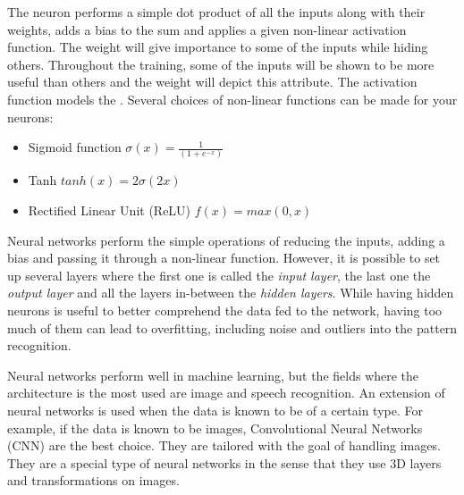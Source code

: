 
The neuron performs a simple dot product of all the inputs along with their weights, adds a bias to the sum and applies a given non-linear activation function. The weight will give importance to some of the inputs while hiding others. Throughout the training, some of the inputs will be shown to be more useful than others and the weight will depict this attribute. The activation function models the . Several choices of non-linear functions can be made for your neurons:
\begin{itemize}
  \item Sigmoid function $\sigma(x) = \frac{1}{(1+e^{-x})}$
  \item Tanh $tanh(x) = 2\sigma(2x)$
  \item Rectified Linear Unit (ReLU) $ f(x) = max(0,x) $
\end{itemize}

Neural networks perform the simple operations of reducing the inputs, adding a bias and passing it through a non-linear function. However, it is possible to set up several layers where the first one is called the \emph{input layer}, the last one the \emph{output layer} and all the layers in-between the \emph{hidden layers}. While having hidden neurons is useful to better comprehend the data fed to the network, having too much of them can lead to overfitting, including noise and outliers into the pattern recognition.

Neural networks perform well in machine learning, but the fields where the architecture is the most used are image and speech recognition. An extension of neural networks is used when the data is known to be of a certain type. For example, if the data is known to be images, Convolutional Neural Networks (CNN) are the best choice. They are tailored with the goal of handling images. They are a special type of neural networks in the sense that they use 3D layers and transformations on images.


